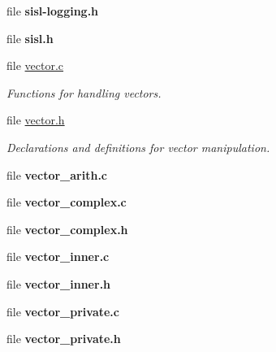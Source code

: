 \begin{CompactItemize}
\item 
file {\bf sisl-logging.h}
\item 
file {\bf sisl.h}
\item 
file \hyperlink{vector_8c}{vector.c}
\begin{CompactList}\small\item\em Functions for handling vectors. \item\end{CompactList}

\item 
file \hyperlink{vector_8h}{vector.h}
\begin{CompactList}\small\item\em Declarations and definitions for vector manipulation. \item\end{CompactList}

\item 
file {\bf vector\_\-arith.c}
\item 
file {\bf vector\_\-complex.c}
\item 
file {\bf vector\_\-complex.h}
\item 
file {\bf vector\_\-inner.c}
\item 
file {\bf vector\_\-inner.h}
\item 
file {\bf vector\_\-private.c}
\item 
file {\bf vector\_\-private.h}
\end{CompactItemize}
